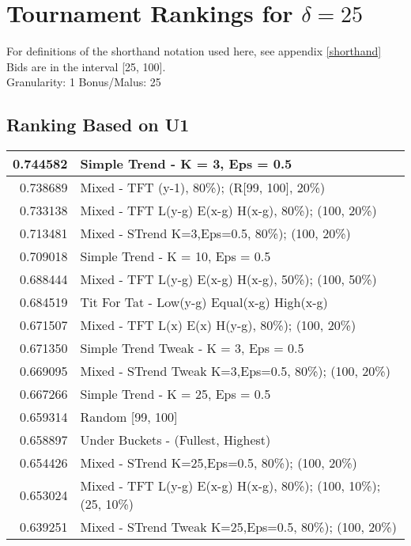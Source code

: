 \newpage  
\section{Tournament Rankings for $\delta = 25$}\label{results_25}
For definitions of the shorthand notation used here, see appendix \ref{shorthand} \\
\newline
Bids are in the interval [25, 100].\\
Granularity: 1\hspace{0.25in} Bonus/Malus: 25\\
\begin{table}[!hbtp]
\subsection{Ranking Based on U1}
\begin{footnotesize}
\begin{tabular}{|r|l|}\hline  \label{U3results}
0.744582 & Simple Trend - K = 3, Eps = 0.5\\ \hline
0.738689 & Mixed - {TFT (y-1), 80\%); (R[99, 100], 20\%)}\\ \hline
0.733138 & Mixed - {TFT L(y-g) E(x-g) H(x-g), 80\%); (100, 20\%)}\\ \hline
0.713481 & Mixed - {STrend K=3,Eps=0.5, 80\%); (100, 20\%)}\\ \hline
0.709018 & Simple Trend - K = 10, Eps = 0.5\\ \hline
0.688444 & Mixed - {TFT L(y-g) E(x-g) H(x-g), 50\%); (100, 50\%)}\\ \hline
0.684519 & Tit For Tat - Low(y-g) Equal(x-g) High(x-g)\\ \hline
0.671507 & Mixed - {TFT L(x) E(x) H(y-g), 80\%); (100, 20\%)}\\ \hline
0.671350 & Simple Trend Tweak - K = 3, Eps = 0.5\\ \hline
0.669095 & Mixed - {STrend Tweak K=3,Eps=0.5, 80\%); (100, 20\%)}\\ \hline
0.667266 & Simple Trend - K = 25, Eps = 0.5\\ \hline
0.659314 & Random [99, 100]\\ \hline
0.658897 & Under Buckets - (Fullest, Highest)\\ \hline
0.654426 & Mixed - {STrend K=25,Eps=0.5, 80\%); (100, 20\%)}\\ \hline
0.653024 & Mixed - {TFT L(y-g) E(x-g) H(x-g), 80\%); (100, 10\%); (25, 10\%)}\\ \hline
0.639251 & Mixed - {STrend Tweak K=25,Eps=0.5, 80\%); (100, 20\%)}\\ \hline

\end{tabular}
\end{footnotesize}
\end{table}
